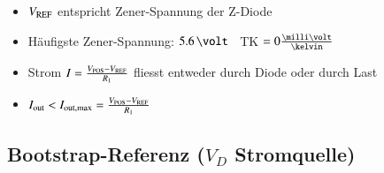 \hfill
\begin{minipage}[c]{0.78\columnwidth}
    \begin{itemize}
        \item $V_{\rm REF}$ entspricht Zener-Spannung der Z-Diode
        \item Häufigste Zener-Spannung: $5.6 \, \volt$ \textrightarrow\ TK $= 0 \frac{\milli \volt}{\kelvin}$
        \item Strom $I = \frac{V_{\rm POS} - V_{\rm REF}}{R_1}$ fliesst entweder durch Diode oder durch Last
        \item $I_{\rm out} < I_{\rm out, max} = \frac{V_{\rm POS} - V_{\rm REF}}{R_1}$
    \end{itemize}

\end{minipage}


\subsection[Bootstrap-Referenz (VD Stromquelle)]{Bootstrap-Referenz ($V_D$ Stromquelle)}

